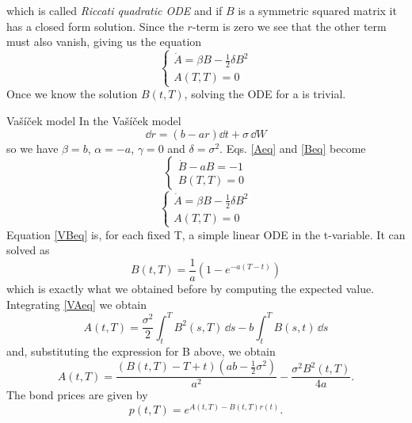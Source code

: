 which is called \emph{Riccati quadratic ODE} and if $B$ is a symmetric squared matrix it has a closed form solution.
Since the $r$-term is zero we see that the other term must also vanish,
giving us the equation
\begin{equation}\label{Beq}
    \begin{cases}
    \dot{A} = \beta B - \frac{1}{2}\delta B^2 \\
    A(T,T) = 0
    \end{cases}
\end{equation}
Once we know the solution $B(t,T)$, solving the ODE for a is trivial.
\begin{example}{Vašíček model}{}{} %
    In the Vašíček model
    \begin{equation*}
        \dd r = (b - ar)\dd t + \sigma\,\dd W
    \end{equation*}
    so we have $\beta = b$, $\alpha = -a$, $\gamma = 0$ and $\delta = \sigma^2$. Eqs. \eqref{Aeq} and \eqref{Beq} become
    \begin{equation}
    \begin{cases}\label{VBeq}
        \dot{B} - aB = -1 \\
        B(T,T) = 0
    \end{cases}
    \end{equation}
    \begin{equation}
    \begin{cases}\label{VAeq}
    \dot{A} = \beta B - \frac{1}{2}\delta B^2 \\
    A(T,T) = 0
    \end{cases}
    \end{equation}
    Equation \eqref{VBeq} is, for each fixed T, a simple linear ODE in the t-variable. It can solved as
    \begin{equation*}
        B(t,T) = \frac{1}{a}\left(1-e^{-a(T-t)}\right)
    \end{equation*}
    which is exactly what we obtained before by computing the expected value. Integrating \eqref{VAeq} we obtain
    \begin{equation*}
        A(t,T) = \frac{\sigma^2}{2}\int_t^T B^2(s,T)\,\dd s - b\int_t^T B(s,t)\,\dd s
    \end{equation*}
    and, substituting the expression for B above, we obtain
    \begin{equation*}
        A(t,T) = \frac{(B(t,T)-T+t)(ab-\tfrac{1}{2}\sigma^2)}{a^2} -            \frac{\sigma^2 B^2(t,T)}{4a}.
    \end{equation*}
    The bond prices are given by
    \begin{equation*}
        p(t,T) = e^{A(t,T)-B(t,T)r(t)}.
    \end{equation*}
\end{example}
